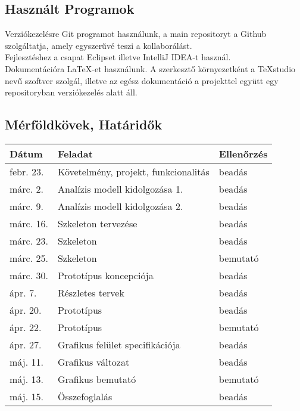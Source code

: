 \subsection{Használt Programok}

 Verziókezelésre Git programot használunk, a main repositoryt a Github szolgáltatja, amely egyszerűvé teszi a kollaborálást.\\

Fejlesztéshez a csapat Eclipset illetve IntelliJ IDEA-t használ.\\

Dokumentációra LaTeX-et használunk. A szerkesztő környezetként a TeXstudio nevű szoftver szolgál, illetve az egész dokumentáció a projekttel együtt egy repositoryban verziókezelés alatt áll.\\

\subsection{Mérföldkövek, Határidők}

\begin{center}
	\begin{tabular}{ | l | l | l | }
		\hline
		\textbf{Dátum} &
		\textbf{Feladat} &
		\textbf{Ellenőrzés}
		
		\\ \hline \hline
		febr. 23. & Követelmény, projekt, funkcionalitás & beadás
		\\ \hline 
		márc. 2. &	Analízis modell kidolgozása 1. & beadás
		\\ \hline 
		márc. 9. &	Analízis modell kidolgozása 2. & beadás
		\\ \hline 
		márc. 16. &	Szkeleton tervezése & beadás
		\\ \hline 		
		márc. 23. &	Szkeleton & beadás
		\\ \hline
		márc. 25. & Szkeleton & bemutató
		\\ \hline 
		márc. 30. &	Prototípus koncepciója & beadás
		\\ \hline 
		ápr. 7.	 & Részletes tervek & beadás
		\\ \hline 
		ápr. 20. &	Prototípus & beadás
		\\ \hline 
		ápr. 22. & Prototípus & bemutató
		\\ \hline
		ápr. 27. &	Grafikus felület specifikációja & beadás
		\\ \hline 	 
		máj. 11. &	Grafikus változat & beadás
		\\ \hline
		máj. 13. & Grafikus bemutató & bemutató
		\\ \hline
		máj. 15. &	Összefoglalás & beadás
		\\ \hline 
	\end{tabular}
\end{center}

